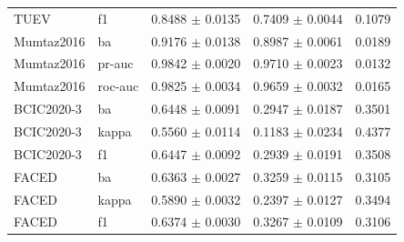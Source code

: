 \begin{table}[tbp]
\begin{tabular}{@{}l l c c c@{}}
TUEV & f1 & 0.8488 $\pm$ 0.0135 & 0.7409 $\pm$ 0.0044 & 0.1079 \\
Mumtaz2016 & ba & 0.9176 $\pm$ 0.0138 & 0.8987 $\pm$ 0.0061 & 0.0189 \\
Mumtaz2016 & pr-auc & 0.9842 $\pm$ 0.0020 & 0.9710 $\pm$ 0.0023 & 0.0132 \\
Mumtaz2016 & roc-auc & 0.9825 $\pm$ 0.0034 & 0.9659 $\pm$ 0.0032 & 0.0165 \\
BCIC2020-3 & ba & 0.6448 $\pm$ 0.0091 & 0.2947 $\pm$ 0.0187 & 0.3501 \\
BCIC2020-3 & kappa & 0.5560 $\pm$ 0.0114 & 0.1183 $\pm$ 0.0234 & 0.4377 \\
BCIC2020-3 & f1 & 0.6447 $\pm$ 0.0092 & 0.2939 $\pm$ 0.0191 & 0.3508 \\
FACED & ba & 0.6363 $\pm$ 0.0027 & 0.3259 $\pm$ 0.0115 & 0.3105 \\
FACED & kappa & 0.5890 $\pm$ 0.0032 & 0.2397 $\pm$ 0.0127 & 0.3494 \\
FACED & f1 & 0.6374 $\pm$ 0.0030 & 0.3267 $\pm$ 0.0109 & 0.3106 \\
\bottomrule\end{tabular}\end{table}

